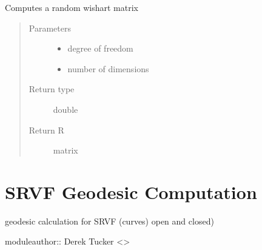 \documentclass[letterpaper,10pt,english]{sphinxmanual}
\begin{document}

\begin{fulllineitems}
\label{\detokenize{tolerance:tolerance.rwishart}}
Computes a random wishart matrix
\begin{quote}\begin{description}
\item[{Parameters}] \leavevmode\begin{itemize}
\item {} 
 \textendash{} degree of freedom

\item {} 
 \textendash{} number of dimensions

\end{itemize}

\item[{Return type}] \leavevmode
double

\item[{Return R}] \leavevmode
matrix

\end{description}\end{quote}

\end{fulllineitems}



\chapter{SRVF Geodesic Computation}
\label{\detokenize{geodesic:module-geodesic}}\label{\detokenize{geodesic:srvf-geodesic-computation}}\label{\detokenize{geodesic::doc}}
geodesic calculation for SRVF (curves) open and closed)

moduleauthor:: Derek Tucker \textless{}\textgreater{}
\end{document}
